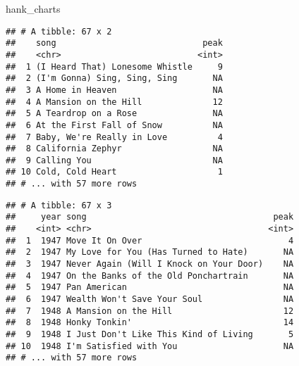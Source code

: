 \documentclass[]{article}
\newenvironment{Shaded}{\begin{snugshade}}{\end{snugshade}}
\newcommand{\KeywordTok}[1]{\textcolor[rgb]{0.13,0.29,0.53}{\textbf{#1}}}
\newcommand{\StringTok}[1]{\textcolor[rgb]{0.31,0.60,0.02}{#1}}
\newcommand{\CommentTok}[1]{\textcolor[rgb]{0.56,0.35,0.01}{\textit{#1}}}
\newcommand{\OperatorTok}[1]{\textcolor[rgb]{0.81,0.36,0.00}{\textbf{#1}}}
\newcommand{\NormalTok}[1]{#1}
\begin{document}
\begin{Shaded}
\begin{Highlighting}[]
\NormalTok{hank_charts}
\end{Highlighting}
\end{Shaded}

\begin{verbatim}
## # A tibble: 67 x 2
##    song                             peak
##    <chr>                           <int>
##  1 (I Heard That) Lonesome Whistle     9
##  2 (I'm Gonna) Sing, Sing, Sing       NA
##  3 A Home in Heaven                   NA
##  4 A Mansion on the Hill              12
##  5 A Teardrop on a Rose               NA
##  6 At the First Fall of Snow          NA
##  7 Baby, We're Really in Love          4
##  8 California Zephyr                  NA
##  9 Calling You                        NA
## 10 Cold, Cold Heart                    1
## # ... with 57 more rows
\end{verbatim}

\begin{Shaded}
\end{Shaded}

\begin{verbatim}
## # A tibble: 67 x 3
##     year song                                     peak
##    <int> <chr>                                   <int>
##  1  1947 Move It On Over                             4
##  2  1947 My Love for You (Has Turned to Hate)       NA
##  3  1947 Never Again (Will I Knock on Your Door)    NA
##  4  1947 On the Banks of the Old Ponchartrain       NA
##  5  1947 Pan American                               NA
##  6  1947 Wealth Won't Save Your Soul                NA
##  7  1948 A Mansion on the Hill                      12
##  8  1948 Honky Tonkin'                              14
##  9  1948 I Just Don't Like This Kind of Living       5
## 10  1948 I'm Satisfied with You                     NA
## # ... with 57 more rows
\end{verbatim}
\end{document}

